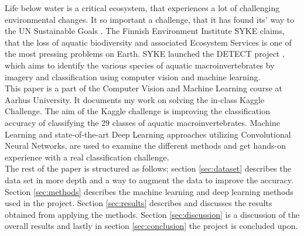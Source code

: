 Life below water is a critical ecosystem, that experiences a lot of challenging environmental changes. It so important a challenge, that it has found its' way to the UN Sustainable Goals \cite{UN}. The Finnish Environment Institute \cite{meissner} SYKE claims, that the loss of aquatic biodiversity and associated Ecosystem Services is one of the most pressing problems on Earth. SYKE launched the DETECT project \cite{DETECT}, which aims to identify the various species of aquatic macroinvertebrates by imagery and classification using computer vision and machine learning. \\

This paper is a part of the Computer Vision and Machine Learning course at Aarhus University. It documents my work on solving the in-class Kaggle Challenge. The aim of the Kaggle challenge is improving the classification accuracy of classifying the 29 classes of aquatic macroinvertebrates. Machine Learning and state-of-the-art Deep Learning approaches utilizing Convolutional Neural Networks, are used to examine the different methods and get hands-on experience with a real classification challenge. \\

The rest of the paper is structured as follows; section \ref{sec:dataset} describes the data set in more depth and a way to augment the data to improve the accuracy. Section \ref{sec:methods} describes the machine learning and deep learning methods used in the project. Section \ref{sec:results} describes and discusses the results obtained from applying the methods. Section \ref{sec:discussion} is a discussion of the overall results and lastly in section \ref{sec:conclusion} the project is concluded upon.